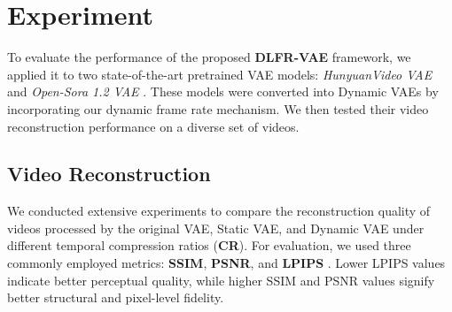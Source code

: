 \section{Experiment}



To evaluate the performance of the proposed \textbf{DLFR-VAE} framework, we applied it to two state-of-the-art pretrained VAE models: \textit{HunyuanVideo VAE} \cite{kong2024hunyuanvideo} and \textit{Open-Sora 1.2 VAE} \cite{zheng2024open}. These models were converted into Dynamic VAEs by incorporating our dynamic frame rate mechanism. We then tested their video reconstruction performance on a diverse set of videos.

\subsection{Video Reconstruction}

We conducted extensive experiments to compare the reconstruction quality of videos processed by the original VAE, Static VAE, and Dynamic VAE under different temporal compression ratios (\textbf{CR}). For evaluation, we used three commonly employed metrics: \textbf{SSIM}, \textbf{PSNR}, and \textbf{LPIPS} \cite{zhang2018unreasonable}. Lower LPIPS values indicate better perceptual quality, while higher SSIM and PSNR values signify better structural and pixel-level fidelity.

